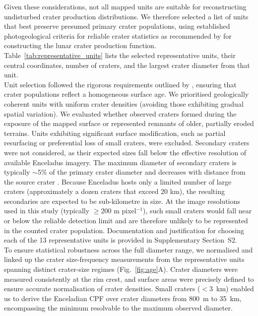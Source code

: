 \documentclass[preprint,11pt,3p,times,authoryear]{elsarticle}
\begin{document}
Given these considerations, not all mapped units are suitable for reconstructing undisturbed crater production distributions. We therefore selected a list of units that best preserve presumed primary crater populations, using established photogeological criteria for reliable crater statistics as recommended by \citet{Neukum1983} for constructing the lunar crater production function.
Table~\ref{tab:representative_units} lists the selected representative units, their central coordinates, number of craters, and the largest crater diameter from that unit.\\

Unit selection followed the rigorous requirements outlined by \citet{Neukum1983}, ensuring that crater populations reflect a homogeneous surface age. We prioritised geologically coherent units with uniform crater densities (avoiding those exhibiting gradual spatial variation). We evaluated whether observed craters formed during the exposure of the mapped surface or represented remnants of older, partially eroded terrains. Units exhibiting significant surface modification, such as partial resurfacing or preferential loss of small craters, were excluded. Secondary craters were not considered, as their expected sizes fall below the effective resolution of available Enceladus imagery. The maximum diameter of secondary craters is typically $\sim$5\% of the primary crater diameter \citep{Schultz1980} and decreases with distance from the source crater \citep{McEwen2006}. Because Enceladus hosts only a limited number of large craters (approximately a dozen craters that exceed 20 km), the resulting secondaries are expected to be sub-kilometre in size. At the image resolutions used in this study (typically $\ge$200 m pixel$^{-1}$), such small craters would fall near or below the reliable detection limit and are therefore unlikely to be represented in the counted crater population. Documentation and justification for choosing each of the 13 representative units is provided in Supplementary Section~S2.\\

To ensure statistical robustness across the full diameter range, we normalised and linked up the crater size-frequency measurements from the representative units spanning distinct crater-size regimes (Fig.~\ref{fig:age}A).
Crater diameters were measured consistently at the rim crest, and surface areas were precisely defined to ensure accurate normalisation of crater densities.
Small craters ($<3$~km)%
enabled us to derive the Enceladian CPF over crater diameters from 800~m to 35~km, encompassing the minimum resolvable to the maximum observed diameter.
\end{document}

